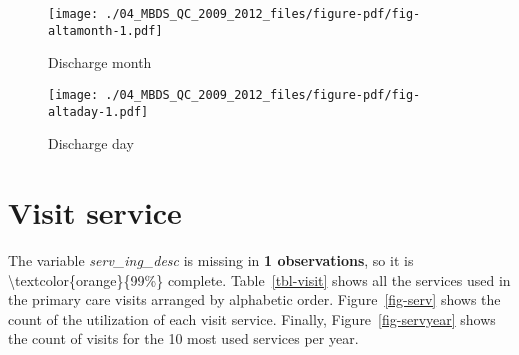 \documentclass[
  letterpaper,
  DIV=11,
  numbers=noendperiod]{scrreprt}
\begin{document}
\begin{figure}

{\centering \texttt{[image: ./04\_MBDS\_QC\_2009\_2012\_files/figure-pdf/fig-altamonth-1.pdf]}

}

\caption{\label{fig-altamonth}Discharge month}

\end{figure}

\begin{figure}

{\centering \texttt{[image: ./04\_MBDS\_QC\_2009\_2012\_files/figure-pdf/fig-altaday-1.pdf]}

}

\caption{\label{fig-altaday}Discharge day}

\end{figure}

\hypertarget{visit-service}{%
\section{Visit service}\label{visit-service}}

The variable \emph{serv\_ing\_desc} is missing in \textbf{1
observations}, so it is \textbackslash textcolor\{orange\}\{99\%\}
complete. Table~\ref{tbl-visit} shows all the services used in the
primary care visits arranged by alphabetic order. Figure~\ref{fig-serv}
shows the count of the utilization of each visit service. Finally,
Figure~\ref{fig-servyear} shows the count of visits for the 10 most used
services per year.
\end{document}
